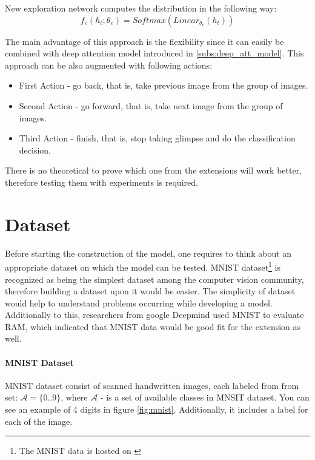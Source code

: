 New exploration network computes the distribution in the following way:
\begin{equation}
	f_e(h_t; \theta_e) = Softmax(Linear_{\theta_e}(h_t))
\end{equation}

The main advantage of this approach is the flexibility since it can easily be combined
with deep attention model introduced in \autoref{subs:deep_att_model}. This
approach can be also augmented with following actions:
\begin{itemize}
	\item First Action - go back, that is, take previous image from the group of images.
	\item Second Action - go forward, that is, take next image from the group of images.
	\item Third Action - finish, that is, stop taking glimpse and do the classification decision.
\end{itemize}

There is no theoretical to prove which one from the extensions will work better,
therefore testing them with experiments is required.
\section{Dataset}
\label{sec:analysis_dataset}

Before starting the construction of the model, one requires to think about an appropriate
dataset on which the model can be tested.
MNIST dataset\footnote{The MNIST data is hosted on \cite{LeCun2010}} is recognized
as being the simplest dataset among the computer vision
community, therefore building a dataset upon it would be easier. The simplicity of dataset
would help to understand problems occurring while developing a model.
Additionally to this, researchers from google
Deepmind used MNIST to evaluate RAM, which indicated that MNIST data would
be good fit for the extension as well. \cite{DBLP:journals/corr/MnihHGK14}


\paragraph{MNIST Dataset} MNIST dataset consist of scanned handwritten images, each labeled
from from set: $\mathcal{A} = \{0 .. 9\}$, where $\mathcal{A}$ - is a set of available
classes in MNSIT dataset. You can see an example of 4 digits in figure \ref{fig:mnist}.
Additionally, it includes a label for each of the image.

